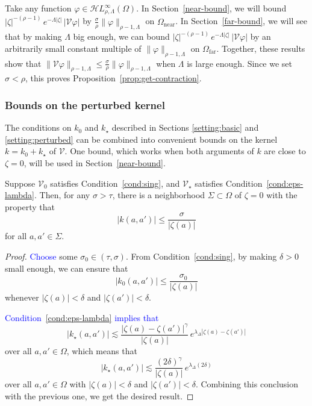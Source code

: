 \documentclass[review]{siamart220329}
\newcommand{\singexp}[2]{\mathcal{H}L^\infty_{#1, #2}}
\newcommand{\volterra}{\mathcal{V}}
\newcommand{\hardpart}{\mathcal{V}_0}
\newcommand{\softpart}{\mathcal{V}_\star}
\newcommand{\kerwhole}{k}
\newcommand{\hardker}{k_0}
\newcommand{\softker}{k_\star}
\newcommand{\domain}{\Omega}
\newcommand{\near}{\Omega_\text{near}}
\newcommand{\far}{\Omega_\text{far}}
\begin{document}
Take any function $\varphi \in \singexp{\rho}{\Lambda}(\domain)$. In Section~\ref{near-bound}, we will bound $|\zeta|^{-(\rho-1)}\,e^{-\Lambda|\zeta|}\,|\volterra\varphi|$ by $\tfrac{\sigma}{\rho} \|\varphi\|_{\rho-1, \Lambda}$ on $\near$. In Section~\ref{far-bound}, we will see that by making $\Lambda$ big enough, we can bound $|\zeta|^{-(\rho-1)}\,e^{-\Lambda|\zeta|}\,|\volterra\varphi|$ by an arbitrarily small constant multiple of $\|\varphi\|_{\rho-1, \Lambda}$ on $\far$. Together, these results show that $\|\volterra \varphi\|_{\rho-1, \Lambda} \le \tfrac{\sigma}{\rho} \|\varphi\|_{\rho-1, \Lambda}$ when $\Lambda$ is large enough. Since we set $\sigma < \rho$, this proves Proposition~\ref{prop:get-contraction}.
\subsubsection{Bounds on the perturbed kernel}\label{sec:bounds on k}
The conditions on $\hardker$ and $\softker$ described in Sections \ref{setting:basic} and \ref{setting:perturbed} can be combined into convenient bounds on the kernel $\kerwhole = \hardker + \softker$ of $\volterra$. One bound, which works when both arguments of $\kerwhole$ are close to $\zeta = 0$, will be used in Section~\ref{near-bound}.
\color{blue}\begin{proposition}\label{prop:whole-ker-near-bound}
Suppose $\hardpart$ satisfies Condition~\eqref{cond:sing}, and $\softpart$ satisfies Condition~\eqref{cond:eps-lambda}. Then, for any $\sigma > \tau$, there is a neighborhood $\Sigma \subset \Omega$ of $\zeta = 0$ with the property that
\[ |\kerwhole(a, a')| \le \frac{\sigma}{|\zeta(a)|} \]
for all $a, a' \in \Sigma$.
\end{proposition}\color{black}
\begin{proof}
\textcolor{blue}{Choose} some $\sigma_0 \in (\tau, \sigma)$. From Condition~\eqref{cond:sing}, by making $\delta > 0$ small enough, we can ensure that
\[ |\hardker(a, a')| \le \frac{\sigma_0}{|\zeta(a)|} \]
whenever $|\zeta(a)| < \delta$ and $|\zeta(a')| < \delta$.

\textcolor{blue}{Condition~\eqref{cond:eps-lambda} implies that}
\[ | \softker(a, a') | \lesssim\frac{|\zeta(a)-\zeta(a')|^\gamma}{|\zeta(a)|}\,e^{\lambda_\Delta|\zeta(a)-\zeta(a')|}\]
over all $a, a' \in \domain$, which means that
\[ | \softker(a, a') | \lesssim\frac{(2\delta)^\gamma}{|\zeta(a)|}\,e^{\lambda_\Delta(2\delta)}\]
over all $a, a' \in \domain$ with $|\zeta(a)| < \delta$ and $|\zeta(a')| < \delta$. Combining this conclusion with the previous one, we get the desired result.
\end{proof}
\end{document}
